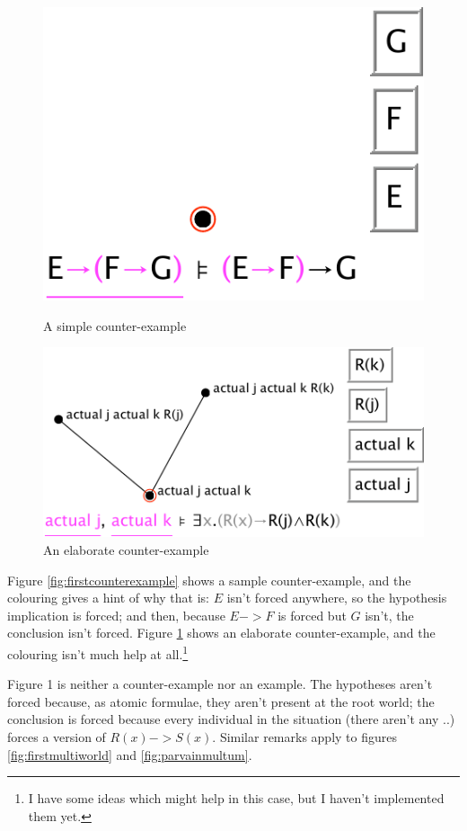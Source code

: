 \documentclass[11pt]{article}
\begin{document}
\begin{figure}
\centering
\parbox{150pt}{\centering
\includegraphics[scale=0.6]{pics/firstcounterexample}
\caption{A simple counter-example}
\label{fig:firstcounterexample}
}
\qquad
\parbox{250pt}{\centering
\includegraphics[scale=0.6]{pics/elaboratecounterexample}
\caption{An elaborate counter-example}
\label{fig:elaboratecounterexample}
}
\end{figure}

Figure \ref{fig:firstcounterexample} shows a sample counter-example, and the colouring gives a hint of why that is: $E$ isn't forced anywhere, so the hypothesis implication is forced; and then, because $E->F$ is forced but $G$ isn't, the conclusion isn't forced. Figure \ref{fig:elaboratecounterexample} shows an elaborate counter-example, and the colouring isn't much help at all.\footnote{I have some ideas which might help in this case, but I haven't implemented them yet.}

Figure 1 is neither a counter-example nor an example. The hypotheses aren't forced because, as atomic formulae, they aren't present at the root world; the conclusion is forced because every individual in the situation (there aren't any ..) forces a version of $R(x)->S(x)$. Similar remarks apply to figures \ref{fig:firstmultiworld} and \ref{fig:parvainmultum}.
\end{document}
